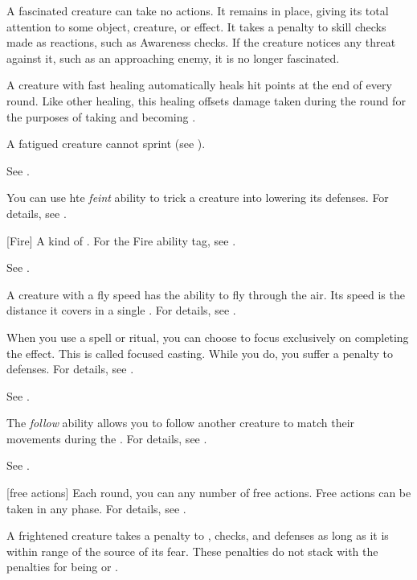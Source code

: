  A fascinated creature can take no actions. It remains in place, giving its total attention to some object, creature, or effect. It takes a  penalty to skill checks made as reactions, such as Awareness checks. If the creature notices any threat against it, such as an approaching enemy, it is no longer fascinated.

 A creature with fast healing automatically heals hit points at the end of every round.
Like other healing, this healing offsets damage taken during the round for the purposes of taking  and becoming \wounded.

 A fatigued creature cannot sprint (see ).

 See .

 You can use hte \textit{feint} ability to trick a creature into lowering its defenses.
For details, see .

[Fire] A kind of . For the Fire ability tag, see .

 See .

 A creature with a fly speed has the ability to fly through the air.
Its speed is the distance it covers in a single .
For details, see .

 When you use a spell or ritual, you can choose to focus exclusively on completing the effect.
This is called focused casting.
While you do, you suffer a  penalty to defenses.
For details, see .

 See .

 The \textit{follow} ability allows you to follow another creature to match their movements during the .
For details, see .

 See .

[free actions] Each round, you can any number of free actions.
Free actions can be taken in any phase.
For details, see .

 A frightened creature takes a  penalty to , checks, and defenses as long as it is within \rngmed range of the source of its fear.
These penalties do not stack with the penalties for being \shaken or \panicked.

